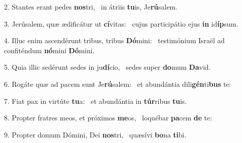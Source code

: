 2. Stantes erant pedes \textbf{nos}tri, \ast\  in átriis \textbf{tu}is, Je\textbf{rú}salem.\

3. Jerúsalem, quæ ædificátur ut \textbf{cí}vitas: \ast\  cujus participátio ejus \textbf{in} id\textbf{íp}sum.\

4. Illuc enim ascendérunt tribus, tribus \textbf{Dó}mini: \ast\  testimónium Israël ad confiténdum \textbf{nó}mini \textbf{Dó}mini.\

5. Quia illic sedérunt sedes in ju\textbf{dí}cio, \ast\  sedes super \textbf{do}mum \textbf{Da}vid.\

6. Rogáte quæ ad pacem sunt Je\textbf{rú}salem: \ast\  et abundántia dili\textbf{gén}ti\textbf{bus} te:\

7. Fiat pax in virtúte \textbf{tu}a: \ast\  et abundántia in \textbf{túr}ribus \textbf{tu}is.\

8. Propter fratres meos, et próximos \textbf{me}os, \ast\  loquébar \textbf{pa}cem \textbf{de} te:\

9. Propter domum Dómini, Dei \textbf{nos}tri, \ast\  quæsívi \textbf{bo}na \textbf{ti}bi.\

